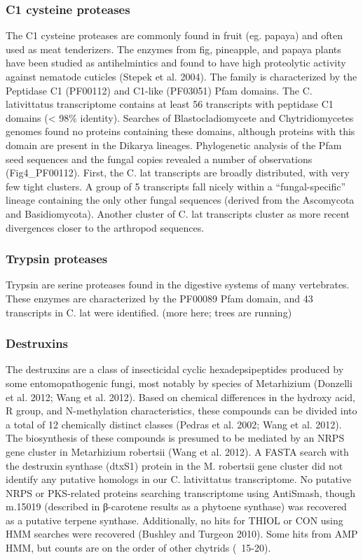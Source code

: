 \subsubsection{C1 cysteine proteases} 
The C1 cysteine proteases are commonly found in fruit (eg. papaya) and often used as meat tenderizers. The enzymes from fig, pineapple, and papaya plants have been studied as antihelmintics and found to have high proteolytic activity against nematode cuticles (Stepek et al. 2004). The family is characterized by the Peptidase C1 (PF00112) and C1-like (PF03051) Pfam domains. The C. lativittatus transcriptome contains at least 56 transcripts with peptidase C1 domains (< 98\% identity). Searches of Blastocladiomycete and Chytridiomycetes genomes found no proteins containing these domains, although proteins with this domain are present in the Dikarya lineages. Phylogenetic analysis of the Pfam seed sequences and the fungal copies revealed a number of observations (Fig4\_PF00112). First, the C. lat transcripts are broadly distributed, with very few tight clusters. A group of 5 transcripts fall nicely within a “fungal-specific” lineage containing the only other fungal sequences (derived from the Ascomycota and Basidiomycota). Another cluster of C. lat transcripts cluster as more recent divergences closer to the arthropod sequences. \\
\subsubsection{Trypsin proteases}
Trypsin are serine proteases found in the digestive systems of many vertebrates. These enzymes are characterized by the PF00089 Pfam domain, and 43 transcripts in C. lat were identified. (more here; trees are running)
\subsubsection{Destruxins}
 The destruxins are a class of insecticidal cyclic hexadepsipeptides produced by some entomopathogenic fungi, most notably by species of Metarhizium (Donzelli et al. 2012; Wang et al. 2012). Based on chemical differences in the hydroxy acid, R group, and N-methylation characteristics, these compounds can be divided into a total of 12 chemically distinct classes (Pedras et al. 2002; Wang et al. 2012). The biosynthesis of these compounds is presumed to be mediated by an NRPS gene cluster in Metarhizium robertsii (Wang et al. 2012). A FASTA search with the destruxin synthase (dtxS1) protein in the M. robertsii gene cluster did not identify any putative homologs in our C. lativittatus transcriptome. No putative NRPS or PKS-related proteins searching transcriptome using AntiSmash, though m.15019 (described in β-carotene results as a phytoene synthase) was recovered as a putative terpene synthase. Additionally, no hits for THIOL or CON using HMM searches were recovered (Bushley and Turgeon 2010). Some hits from AMP HMM, but counts are on the order of other chytrids (~15-20).
